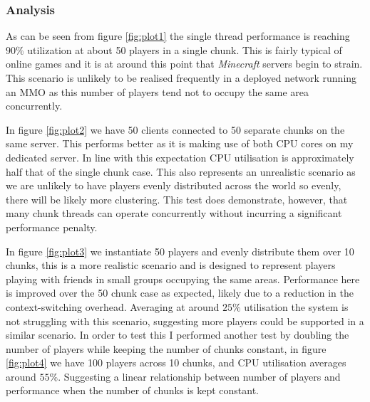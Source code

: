 \documentclass[10pt,twoside,notitlepage,a4paper]{report}
\begin{document}
	\subsubsection{Analysis}
	As can be seen from figure \ref{fig:plot1} the single thread performance is reaching $90\%$ utilization at about 50 players in a single chunk. This is fairly typical of online games and it is at around this point that \emph{Minecraft} servers begin to strain. This scenario is unlikely to be realised frequently in a deployed network running an MMO as this number of players tend not to occupy the same area concurrently.
	
	In figure \ref{fig:plot2} we have 50 clients connected to 50 separate chunks on the same server. This performs better as it is making use of both CPU cores on my dedicated server. In line with this expectation CPU utilisation is approximately half that of the single chunk case. This also represents an unrealistic scenario as we are unlikely to have players evenly distributed across the world so evenly, there will be likely more clustering. This test does demonstrate, however, that many chunk threads can operate concurrently without incurring a significant performance penalty.
	
	In figure \ref{fig:plot3} we instantiate 50 players and evenly distribute them over 10 chunks, this is a more realistic scenario and is designed to represent players playing with friends in small groups occupying the same areas. Performance here is improved over the 50 chunk case as expected, likely due to a reduction in the context-switching overhead. Averaging at around $25\%$ utilisation the system is not struggling with this scenario, suggesting more players could be supported in a similar scenario. In order to test this I performed another test by doubling the number of players while keeping the number of chunks constant, in figure \ref{fig:plot4} we have 100 players across 10 chunks, and CPU utilisation averages around $55\%$. Suggesting a linear relationship between number of players and performance when the number of chunks is kept constant.
	
\end{document}
